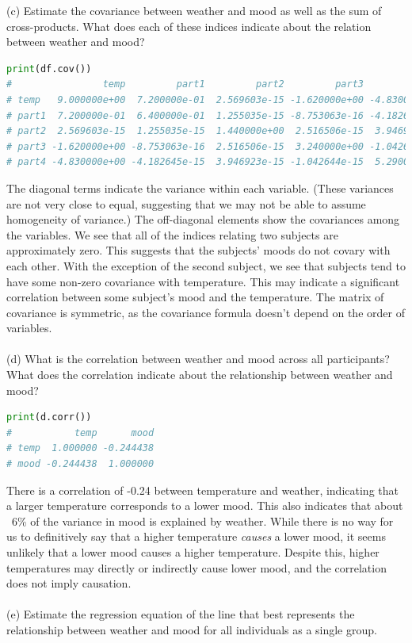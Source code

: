 \documentclass[onecolumn,10pt]{jhwhw}
\begin{document}
\noindent (c) Estimate the covariance between weather and mood as well as the sum of cross-products. What does each of these indices indicate about the relation between weather and mood?
\begin{lstlisting}[language=Python]
print(df.cov())
#                temp         part1         part2         part3         part4
# temp   9.000000e+00  7.200000e-01  2.569603e-15 -1.620000e+00 -4.830000e+00
# part1  7.200000e-01  6.400000e-01  1.255035e-15 -8.753063e-16 -4.182645e-15
# part2  2.569603e-15  1.255035e-15  1.440000e+00  2.516506e-15  3.946923e-15
# part3 -1.620000e+00 -8.753063e-16  2.516506e-15  3.240000e+00 -1.042644e-15
# part4 -4.830000e+00 -4.182645e-15  3.946923e-15 -1.042644e-15  5.290000e+00
\end{lstlisting}
The diagonal terms indicate the variance within each variable. (These variances are not very close to equal, suggesting that we may not be able to assume homogeneity of variance.) The off-diagonal elements show the covariances among the variables. We see that all of the indices relating two subjects are approximately zero. This suggests that the subjects' moods do not covary with each other. With the exception of the second subject, we see that subjects tend to have some non-zero covariance with temperature. This may indicate a significant correlation between some subject's mood and the temperature. The matrix of covariance is symmetric, as the covariance formula doesn't depend on the order of variables.\\
\\
(d) What is the correlation between weather and mood across all participants? What does the correlation indicate about the relationship between weather and mood?
\begin{lstlisting}[language=Python]
print(d.corr())
#           temp      mood
# temp  1.000000 -0.244438
# mood -0.244438  1.000000
\end{lstlisting}
There is a correlation of -0.24 between temperature and weather, indicating that a larger temperature corresponds to a lower mood. This also indicates that about ~6\% of the variance in mood is explained by weather. While there is no way for us to definitively say that a higher temperature \textit{causes} a lower mood, it seems unlikely that a lower mood causes a higher temperature. Despite this, higher temperatures may directly or indirectly cause lower mood, and the correlation does not imply causation.\\
\\
(e) Estimate the regression equation of the line that best represents the relationship between weather and mood for all individuals as a single group.
\end{document}
